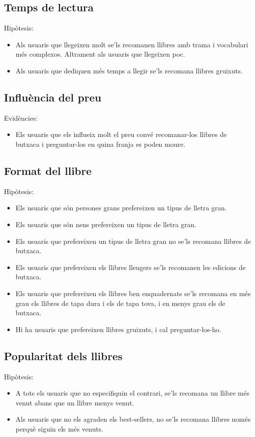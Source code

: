\subsection{Temps de lectura}
Hipòtesis:
\begin{itemize}
  \item Als usuaris que llegeixen molt se'ls recomanen llibres amb trama i vocabulari més complexos. Altrament als usuaris que llegeixen poc.
  \item Als usuaris que dediquen més temps a llegir se'ls recomana llibres gruixuts.
\end{itemize}

\subsection{Influència del preu}
Evidències:
\begin{itemize}
  \item Els usuaris que els influeix molt el preu convé recomanar-los llibres de butxaca i preguntar-los en quina franja es poden moure.
\end{itemize}

\subsection{Format del llibre}
Hipòtesis:
\begin{itemize}
  \item Els usuaris que són persones grans prefereixen un tipus de lletra gran.
  \item Els usuaris que són nens prefereixen un tipus de lletra gran.
  \item Els usuaris que prefereixen un tipus de lletra gran no se'ls recomana llibres de butxaca.
  \item Els usuaris que prefereixen els llibres lleugers se'ls recomanen les edicions de butxaca.
  \item Els usuaris que prefereixen els llibres ben enquadernats se'ls recomana en més grau els llibres de tapa dura i els de tapa tova, i en menys grau els de butxaca.
  \item Hi ha usuaris que prefereixen llibres gruixuts, i cal preguntar-los-ho.
\end{itemize}

\subsection{Popularitat dels llibres}
Hipòtesis:
\begin{itemize}
  \item A tots els usuaris que no especifiquin el contrari, se'ls recomana un llibre més venut abans que un llibre menys venut.
  \item Als usuaris que no els agraden els best-sellers, no se'ls recomana llibres només perquè siguin els més venuts.
\end{itemize}

